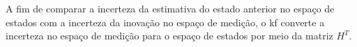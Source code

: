 \documentclass[acronym, symbols, table]{fei}
\begin{document}
				A fim de comparar a incerteza da estimativa do estado anterior no espaço de estados com a incerteza da inovação no espaço de medição, o \acrshort{kf} converte a incerteza no espaço de medição para o espaço de estados por meio da matriz $H^T$.
				
%				
%			
%				
%			
%				
				
\end{document}
